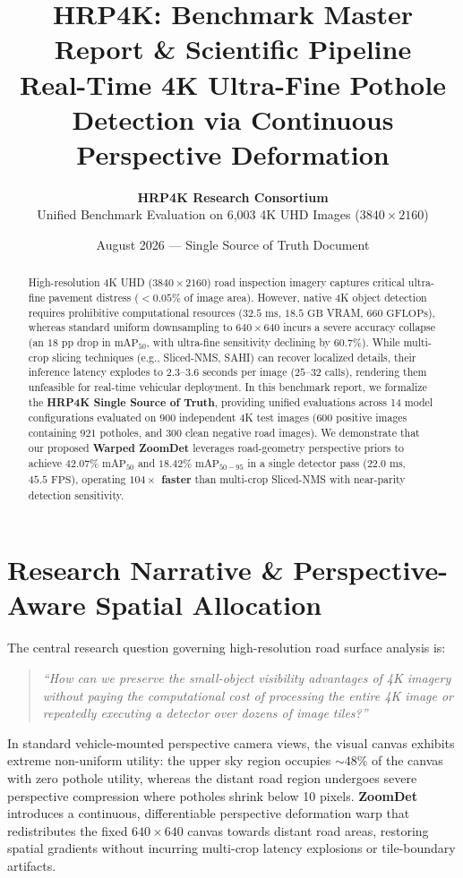 \documentclass[10pt,a4paper]{article}
\title{\vspace{-1.2cm}\textbf{\Large HRP4K: Benchmark Master Report \& Scientific Pipeline}\\[0.3em]
\large Real-Time 4K Ultra-Fine Pothole Detection via Continuous Perspective Deformation}
\author{\textbf{HRP4K Research Consortium} \\
Unified Benchmark Evaluation on 6,003 4K UHD Images ($3840 \times 2160$)}
\date{August 2026 --- Single Source of Truth Document}
\begin{document}
\maketitle

\begin{abstract}
\noindent
High-resolution 4K UHD ($3840 \times 2160$) road inspection imagery captures critical ultra-fine pavement distress ($<0.05\%$ of image area). However, native 4K object detection requires prohibitive computational resources ($32.5\text{ ms}$, $18.5\text{ GB}$ VRAM, $660\text{ GFLOPs}$), whereas standard uniform downsampling to $640 \times 640$ incurs a severe accuracy collapse (an $18\text{ pp}$ drop in $\text{mAP}_{50}$, with ultra-fine sensitivity declining by $60.7\%$). While multi-crop slicing techniques (e.g., Sliced-NMS, SAHI) can recover localized details, their inference latency explodes to $2.3\text{--}3.6\text{ seconds}$ per image ($25\text{--}32\text{ calls}$), rendering them unfeasible for real-time vehicular deployment. In this benchmark report, we formalize the \textbf{HRP4K Single Source of Truth}, providing unified evaluations across 14 model configurations evaluated on $900$ independent 4K test images ($600$ positive images containing $921$ potholes, and $300$ clean negative road images). We demonstrate that our proposed \textbf{Warped ZoomDet} leverages road-geometry perspective priors to achieve \textbf{$42.07\%\text{ mAP}_{50}$} and \textbf{$18.42\%\text{ mAP}_{50-95}$} in a single detector pass ($22.0\text{ ms}$, $45.5\text{ FPS}$), operating \textbf{$104\times$ faster} than multi-crop Sliced-NMS with near-parity detection sensitivity.
\end{abstract}

\vspace{-0.5em}
\section{Research Narrative \& Perspective-Aware Spatial Allocation}
\label{sec:narrative}

\noindent
The central research question governing high-resolution road surface analysis is:
\begin{quote}
\textit{``How can we preserve the small-object visibility advantages of 4K imagery without paying the computational cost of processing the entire 4K image or repeatedly executing a detector over dozens of image tiles?''}
\end{quote}

\noindent
In standard vehicle-mounted perspective camera views, the visual canvas exhibits extreme non-uniform utility: the upper sky region occupies $\sim 48\%$ of the canvas with zero pothole utility, whereas the distant road region undergoes severe perspective compression where potholes shrink below 10 pixels. \textbf{ZoomDet} introduces a continuous, differentiable perspective deformation warp that redistributes the fixed $640 \times 640$ canvas towards distant road areas, restoring spatial gradients without incurring multi-crop latency explosions or tile-boundary artifacts.
\end{document}
